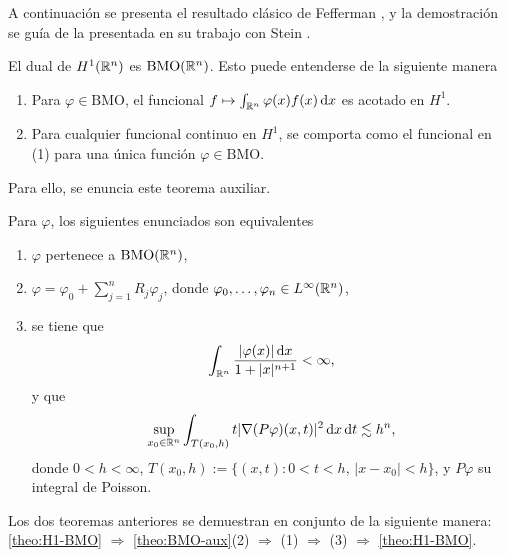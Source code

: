 A continuación se presenta el resultado clásico de Fefferman \cite{fefferman-BMO}, y la demostración se guía de la presentada en su trabajo con Stein \cite{fefferman-stein}.
\begin{theorem}[Fefferman]\label{theo:H1-BMO}
	El dual de $H^1(\mathbb{R}^n)$ es $\mathrm{BMO}(\mathbb{R}^n)$. Esto puede entenderse de la siguiente manera 
	\begin{enumerate}
		\item Para $\varphi \in \mathrm{BMO}$, el funcional $f\mapsto\int_{\mathbb{R}^n}\varphi(x) f(x)\mathop{}\!\mathrm{d} x$ es acotado en $H^1$.
		\item Para cualquier funcional continuo en $H^1$, se comporta como el funcional en (1) para una única función $\varphi \in \mathrm{BMO}$.
	\end{enumerate}
\end{theorem}
Para ello, se enuncia este teorema auxiliar.
\begin{theorem}\label{theo:BMO-aux}
	Para $\varphi$, los siguientes enunciados son equivalentes
	\begin{enumerate}
		\item $\varphi$ pertenece a $\mathrm{BMO}(\mathbb{R}^n)$,
		\item $\varphi = \varphi_0 + \sum_{j=1}^n R_j\varphi_j$, donde $\varphi_0,\ldots,\varphi_n \in L^\infty(\mathbb{R}^n)$,
		\item se tiene que
		\begin{equation*}
			\int_{\mathbb{R}^n}\frac{|\varphi(x)|\mathop{}\!\mathrm{d} x}{1+|x|^{n+1}} < \infty, 
		\end{equation*}
		y que 
		\begin{equation*}
			\sup_{x_0\in\mathbb{R}^n}\int_{T(x_0, h)} t|\nabla (P\varphi)(x, t)|^2\mathop{}\!\mathrm{d} x \mathop{}\!\mathrm{d} t \lesssim h^n,
		\end{equation*}
		donde $0<h<\infty$, $T(x_0, h) := \{(x, t): 0<t<h, \, |x-x_0| < h\}$, y $P\varphi$ su integral de Poisson.
	\end{enumerate}
\end{theorem}
Los dos teoremas anteriores se demuestran en conjunto de la siguiente manera: \cref{theo:H1-BMO} $\Rightarrow$ \cref{theo:BMO-aux}(2) $\Rightarrow$ (1) $\Rightarrow$ (3) $\Rightarrow$ \cref{theo:H1-BMO}.
